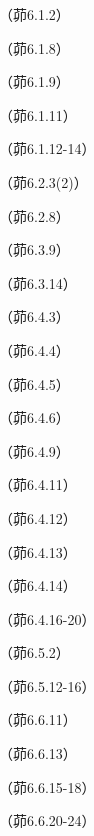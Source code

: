 \begin{problemset}[错题记录]
    \item （茆6.1.2）
    \item （茆6.1.8）
    \item （茆6.1.9）
    \item （茆6.1.11）
    \item （茆6.1.12-14）
    \item （茆6.2.3(2)）
    \item （茆6.2.8）
    \item （茆6.3.9）
    \item （茆6.3.14）
    \item （茆6.4.3）
    \item （茆6.4.4）
    \item （茆6.4.5）
    \item （茆6.4.6）
    \item （茆6.4.9）
    \item （茆6.4.11）
    \item （茆6.4.12）
    \item （茆6.4.13）
    \item （茆6.4.14）
    \item （茆6.4.16-20）
    \item （茆6.5.2）
    \item （茆6.5.12-16）
    \item （茆6.6.11）
    \item （茆6.6.13）
    \item （茆6.6.15-18）
    \item （茆6.6.20-24）
\end{problemset}